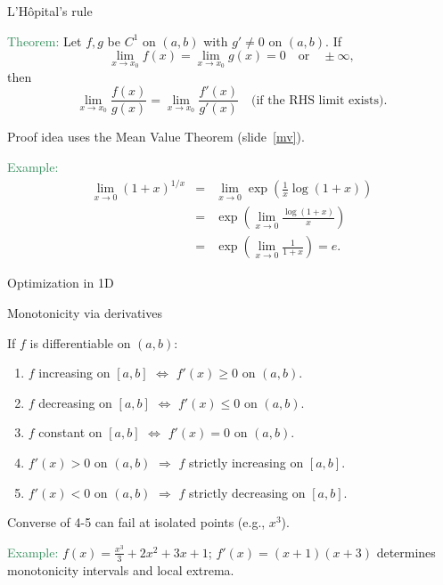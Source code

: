 \documentclass[10pt]{beamer}
\begin{document}
\begin{frame}{L'H\^opital's rule}

 \textcolor{SeaGreen}{Theorem:} Let $f,g$ be $C^1$ on $(a,b)$ with $g'\ne 0$ on $(a,b)$. If
\[
\lim_{x\to x_0} f(x)=\lim_{x\to x_0} g(x)=0\quad\text{or}\quad \pm\infty,
\]
then
\[
\lim_{x\to x_0}\frac{f(x)}{g(x)}=\lim_{x\to x_0}\frac{f'(x)}{g'(x)} \quad\text{(if the RHS limit exists)}.
\]
\begin{tiny}Proof idea uses the Mean Value Theorem (slide~\ref{mv}).\end{tiny}
\bigskip

\textcolor{SeaGreen}{Example:} 
\begin{eqnarray*}
\lim_{x\to 0}(1+x)^{1/x}
&=&\lim_{x\to 0}\exp\left(\frac1x\log(1+x)\right)\\&=& \exp\!\left(\lim_{x\to 0}\frac{\log(1+x)}{x}\right)\\
&=& \exp\!\left(\lim_{x\to 0}\frac{1}{1+x}\right)=e.	
\end{eqnarray*}
\end{frame}

\begin{frame} \begin{center}
	\alert{\Huge Optimization in 1D}
\end{center}\end{frame}



\begin{frame}{Monotonicity via derivatives}

If $f$ is differentiable on $(a,b)$:
\begin{enumerate}
\item $f$ increasing on $[a,b]$ $\Longleftrightarrow$ $f'(x)\ge 0$ on $(a,b)$.
\item $f$ decreasing on $[a,b]$ $\Longleftrightarrow$ $f'(x)\le 0$ on $(a,b)$.
\item $f$ constant on $[a,b]$ $\Longleftrightarrow$ $f'(x)=0$ on $(a,b)$.
\item $f'(x)>0$ on $(a,b)$ $\Rightarrow$ $f$ strictly increasing on $[a,b]$.
\item $f'(x)<0$ on $(a,b)$ $\Rightarrow$ $f$ strictly decreasing on $[a,b]$.
\end{enumerate}
\begin{tiny}Converse of 4-5 can fail at isolated points (e.g., $x^3$).\end{tiny}
\bigskip

\textcolor{SeaGreen}{Example:} $f(x)=\frac{x^3}{3}+2x^2+3x+1$; $f'(x)=(x+1)(x+3)$ determines monotonicity intervals and local extrema.
\end{frame}
\end{document}
